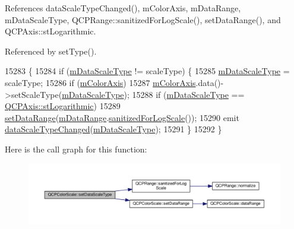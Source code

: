 References data\+Scale\+Type\+Changed(), m\+Color\+Axis, m\+Data\+Range, m\+Data\+Scale\+Type, Q\+C\+P\+Range\+::sanitized\+For\+Log\+Scale(), set\+Data\+Range(), and Q\+C\+P\+Axis\+::st\+Logarithmic.



Referenced by set\+Type().


\begin{DoxyCode}
15283                                                                \{
15284   \textcolor{keywordflow}{if} (\hyperlink{class_q_c_p_color_scale_a2754d6a78736f64a241e333fbd955372}{mDataScaleType} != scaleType) \{
15285     \hyperlink{class_q_c_p_color_scale_a2754d6a78736f64a241e333fbd955372}{mDataScaleType} = scaleType;
15286     \textcolor{keywordflow}{if} (\hyperlink{class_q_c_p_color_scale_a2efbc90fd31898fe05d2b74a8422b1d5}{mColorAxis})
15287       \hyperlink{class_q_c_p_color_scale_a2efbc90fd31898fe05d2b74a8422b1d5}{mColorAxis}.data()->setScaleType(\hyperlink{class_q_c_p_color_scale_a2754d6a78736f64a241e333fbd955372}{mDataScaleType});
15288     \textcolor{keywordflow}{if} (\hyperlink{class_q_c_p_color_scale_a2754d6a78736f64a241e333fbd955372}{mDataScaleType} == \hyperlink{class_q_c_p_axis_a36d8e8658dbaa179bf2aeb973db2d6f0abf5b785ad976618816dc6f79b73216d4}{QCPAxis::stLogarithmic})
15289       \hyperlink{class_q_c_p_color_scale_abe88633003a26d1e756aa74984587fef}{setDataRange}(\hyperlink{class_q_c_p_color_scale_a5d4853feb32cd0077bb2b871687c844b}{mDataRange}.\hyperlink{class_q_c_p_range_aaf6a9046e78d91eeb8e89584fe46b034}{sanitizedForLogScale}());
15290     emit \hyperlink{class_q_c_p_color_scale_a61558b962f7791ff2f15a565dcf60181}{dataScaleTypeChanged}(\hyperlink{class_q_c_p_color_scale_a2754d6a78736f64a241e333fbd955372}{mDataScaleType});
15291   \}
15292 \}
\end{DoxyCode}


Here is the call graph for this function\+:\nopagebreak
\begin{figure}[H]
\begin{center}
\leavevmode
\includegraphics[width=350pt]{class_q_c_p_color_scale_aeb6107d67dd7325145b2498abae67fc3_cgraph}
\end{center}
\end{figure}




